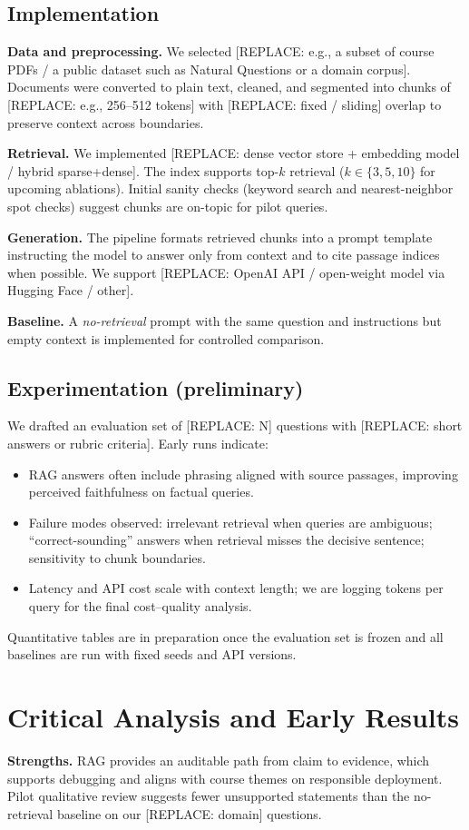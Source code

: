 \documentclass[11pt,a4paper]{article}
\begin{document}
\subsection{Implementation}
\textbf{Data and preprocessing.} We selected [REPLACE: e.g., a subset of course PDFs / a public dataset such as Natural Questions or a domain corpus]. Documents were converted to plain text, cleaned, and segmented into chunks of [REPLACE: e.g., 256--512 tokens] with [REPLACE: fixed / sliding] overlap to preserve context across boundaries.

\textbf{Retrieval.} We implemented [REPLACE: dense vector store + embedding model / hybrid sparse+dense]. The index supports top-$k$ retrieval ($k \in \{3,5,10\}$ for upcoming ablations). Initial sanity checks (keyword search and nearest-neighbor spot checks) suggest chunks are on-topic for pilot queries.

\textbf{Generation.} The pipeline formats retrieved chunks into a prompt template instructing the model to answer only from context and to cite passage indices when possible. We support [REPLACE: OpenAI API / open-weight model via Hugging Face / other].

\textbf{Baseline.} A \emph{no-retrieval} prompt with the same question and instructions but empty context is implemented for controlled comparison.

\subsection{Experimentation (preliminary)}
We drafted an evaluation set of [REPLACE: N] questions with [REPLACE: short answers or rubric criteria]. Early runs indicate:
\begin{itemize}[noitemsep]
    \item RAG answers often include phrasing aligned with source passages, improving perceived faithfulness on factual queries.
    \item Failure modes observed: irrelevant retrieval when queries are ambiguous; ``correct-sounding'' answers when retrieval misses the decisive sentence; sensitivity to chunk boundaries.
    \item Latency and API cost scale with context length; we are logging tokens per query for the final cost--quality analysis.
\end{itemize}
Quantitative tables are in preparation once the evaluation set is frozen and all baselines are run with fixed seeds and API versions.

\section{Critical Analysis and Early Results}
\textbf{Strengths.} RAG provides an auditable path from claim to evidence, which supports debugging and aligns with course themes on responsible deployment. Pilot qualitative review suggests fewer unsupported statements than the no-retrieval baseline on our [REPLACE: domain] questions.
\end{document}
